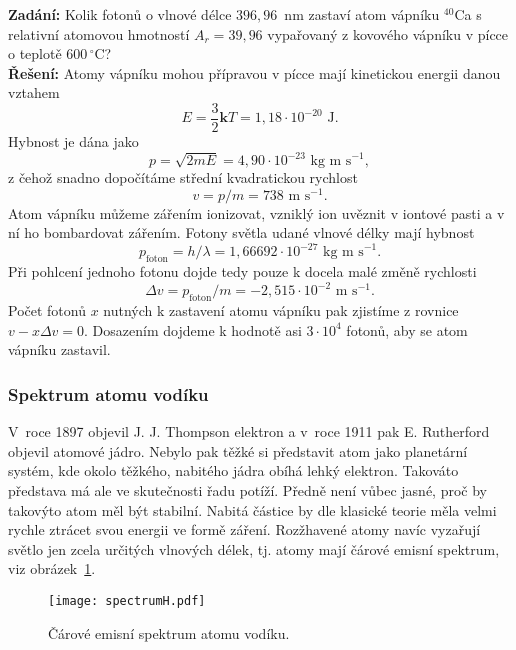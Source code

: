 \begin{priklad}
\textbf{Zadání:} Kolik fotonů o vlnové délce $396{,}96$~nm zastaví atom vápníku $^{40}$Ca s relativní atomovou hmotností $A_r = 39{,}96$ vypařovaný z kovového vápníku v pícce o teplotě $600\,^{\circ}$C?\\[0.1cm]
\textbf{Řešení:} Atomy vápníku mohou přípravou v pícce mají kinetickou energii danou vztahem
\begin{displaymath}
E = \frac{3}{2} \mathbf{k} T = 1{,}18 \cdot 10^{-20} \mbox{ J}.
\end{displaymath}
Hybnost je dána jako
\begin{displaymath}
p = \sqrt{2 m E} = 4{,}90 \cdot 10^{-23} \mbox{ kg m s}^{-1},
\end{displaymath}
z čehož snadno dopočítáme střední kvadratickou rychlost
\begin{displaymath}
v = p/m = 738 \mbox{ m s}^{-1}.
\end{displaymath}
Atom vápníku můžeme zářením ionizovat, vzniklý ion uvěznit v iontové pasti a v ní ho bombardovat zářením. Fotony světla udané vlnové délky mají hybnost
\begin{displaymath}
p_{\mbox{foton}}= h/\lambda = 1{,}66692 \cdot 10^{-27} \mbox{ kg m s}^{-1}.
\end{displaymath}
Při pohlcení jednoho fotonu dojde tedy pouze k docela malé změně rychlosti
\begin{displaymath}
\Delta v = p_{\mbox{foton}}/m = - 2{,}515 \cdot 10^{-2} \mbox{ m s}^{-1}.
\end{displaymath}
Počet fotonů $x$ nutných k zastavení atomu vápníku pak zjistíme z rovnice $v - x \Delta v =0$. Dosazením dojdeme k hodnotě asi $3 \cdot 10^4$ fotonů, aby se atom vápníku zastavil.
\end{priklad}

\subsubsection{Spektrum atomu vodíku}

V~roce 1897 objevil J. J. Thompson elektron a v~roce 1911 pak E. Rutherford objevil atomové jádro. Nebylo pak těžké si představit atom jako planetární systém, kde okolo těžkého, nabitého jádra obíhá lehký elektron. Takováto představa má ale ve skutečnosti řadu potíží. Předně není vůbec jasné, proč by takovýto atom měl být stabilní. Nabitá částice by dle klasické teorie měla velmi rychle ztrácet svou energii ve formě záření. Rozžhavené atomy navíc vyzařují světlo jen zcela určitých vlnových délek, tj. atomy mají čárové emisní spektrum, viz obrázek~\ref{obr:spectrumH}. 
\begin{figure} [ht]
\centering
\texttt{[image: spectrumH.pdf]}
\caption[Emisní spektrum vodíku]{Čárové emisní spektrum atomu vodíku.}
\label{obr:spectrumH}
\end{figure}

